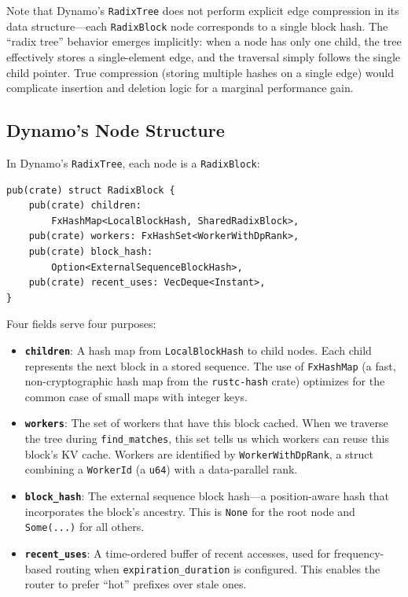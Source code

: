 Note that Dynamo's \texttt{RadixTree} does not perform explicit edge compression in its data structure---each \texttt{RadixBlock} node corresponds to a single block hash. The ``radix tree'' behavior emerges implicitly: when a node has only one child, the tree effectively stores a single-element edge, and the traversal simply follows the single child pointer. True compression (storing multiple hashes on a single edge) would complicate insertion and deletion logic for a marginal performance gain.

\subsection{Dynamo's Node Structure}

In Dynamo's \texttt{RadixTree}, each node is a \texttt{RadixBlock}:

\begin{verbatim}
pub(crate) struct RadixBlock {
    pub(crate) children:
        FxHashMap<LocalBlockHash, SharedRadixBlock>,
    pub(crate) workers: FxHashSet<WorkerWithDpRank>,
    pub(crate) block_hash:
        Option<ExternalSequenceBlockHash>,
    pub(crate) recent_uses: VecDeque<Instant>,
}
\end{verbatim}

Four fields serve four purposes:

\begin{itemize}
  \item \textbf{\texttt{children}}: A hash map from \texttt{LocalBlockHash} to child nodes. Each child represents the next block in a stored sequence. The use of \texttt{FxHashMap} (a fast, non-cryptographic hash map from the \texttt{rustc-hash} crate) optimizes for the common case of small maps with integer keys.
  \item \textbf{\texttt{workers}}: The set of workers that have this block cached. When we traverse the tree during \texttt{find\_matches}, this set tells us which workers can reuse this block's KV cache. Workers are identified by \texttt{WorkerWithDpRank}, a struct combining a \texttt{WorkerId} (a \texttt{u64}) with a data-parallel rank.
  \item \textbf{\texttt{block\_hash}}: The external sequence block hash---a position-aware hash that incorporates the block's ancestry. This is \texttt{None} for the root node and \texttt{Some(...)} for all others.
  \item \textbf{\texttt{recent\_uses}}: A time-ordered buffer of recent accesses, used for frequency-based routing when \texttt{expiration\_duration} is configured. This enables the router to prefer ``hot'' prefixes over stale ones.
\end{itemize}

